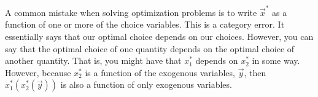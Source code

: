 A common mistake when solving optimization problems is to write $\vec{x}^*$ as a function of one or more of the choice variables. This is a category error. It essentially says that our optimal choice depends on our choices. However, you can say that the optimal choice of one quantity depends on the optimal choice of another quantity. That is, you might have that $x_1^*$ depends on $x_2^*$ in some way. However, because $x_2^*$ is a function of the exogenous variables, $\vec{y}$, then $x_1^*(x_2^*(\vec{y}))$ is also a function of only exogenous variables. 

